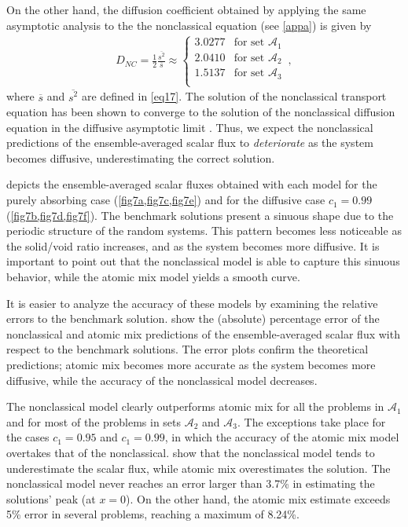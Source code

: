 \documentclass[12pt]{article}
\newcommand{\seta}{\mathcal{A}}
\begin{document}
{On the other hand, the diffusion coefficient obtained by applying the same asymptotic analysis to the the nonclassical equation (see \cref{appa}) is given by 
\begin{align}\label{eq25}
D_{NC} = \frac{1}{2}\frac{\overline{s^2}}{\overline{s}} \approx 
\left\{
\begin{array}{cl}
3.0277 & \text{for set $\seta_1$}\\
2.0410 & \text{for set $\seta_2$}\\
1.5137 & \text{for set $\seta_3$}\\
\end{array}
\right . \, ,
\end{align}  
where $\overline{s}$ and $\overline{s^2}$ are defined in \cref{eq17}.
The solution of the nonclassical transport equation has been shown to converge to the solution of the nonclassical diffusion equation in the diffusive asymptotic limit \cite{ans16}.
Thus, we expect the nonclassical predictions of the ensemble-averaged scalar flux to {\em deteriorate} as the system becomes diffusive, underestimating the correct solution.

 depicts the ensemble-averaged scalar fluxes obtained with each model for the purely absorbing case (\cref{fig7a,fig7c,fig7e}) and for the diffusive case $c_1=0.99$ (\cref{fig7b,fig7d,fig7f}).
The benchmark solutions present a sinuous shape due to the periodic structure of the random systems.
This pattern becomes less noticeable as the solid/void ratio increases, and as the system becomes more diffusive.
It is important to point out that the nonclassical model is able to capture this sinuous behavior, while the atomic mix model yields a smooth curve.

It is easier to analyze the accuracy of these models by examining the relative errors to the benchmark solution.
 show the (absolute) percentage error of the nonclassical and atomic mix predictions of the ensemble-averaged scalar flux with respect to the benchmark solutions.
The error plots confirm the theoretical predictions; atomic mix becomes more accurate as the system becomes more diffusive, while the accuracy of the nonclassical model decreases.

The nonclassical model clearly outperforms atomic mix for all the problems in $\seta_1$ and for most of the problems in sets $\seta_2$ and $\seta_3$.
The exceptions take place for the cases $c_1=0.95$ and $c_1=0.99$, in which the accuracy of the atomic mix model overtakes that of the nonclassical.
 show that the nonclassical model tends to
underestimate the scalar flux, while atomic mix overestimates the solution.
The nonclassical model never reaches an error larger than 3.7\% in estimating the solutions' peak (at $x=0$).
On the other hand, the atomic mix estimate exceeds 5\% error in several problems, reaching a maximum of 8.24\%.

}
\end{document}
